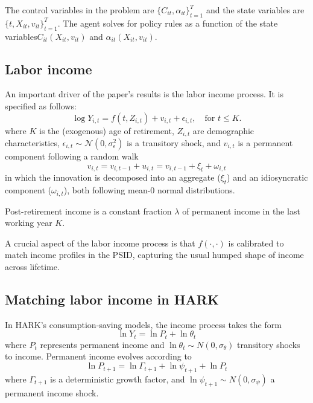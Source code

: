 \documentclass[./CGMPortfolio.tex]{subfiles}
\begin{document}
The control variables in the problem are $\{C_{it}, \alpha_{it}\}^T_{t=1}$ and the state variables are $\{t, X_{it}, v_{it} \}^T_{t=1}$. The agent solves for  policy rules as a function of the state variables\textemdash $C_{it}(X_{it}, v_{it})$ and $\alpha_{it}(X_{it}, v_{it})$.

\subsection{Labor income}

An important driver of the paper's results is the labor income process. It is 
specified as follows:
\begin{equation}
\log Y_{i,t} = f(t,Z_{i,t}) + v_{i,t} + \epsilon_{i,t}, \quad \text{for } t\leq K.
\end{equation}
where $K$ is the (exogenous) age of retirement, $Z_{i,t}$ are demographic 
characteristics, $\epsilon_{i,t}\sim \mathcal{N}(0,\sigma^2_\epsilon)$ is a 
transitory shock, and  $v_{i,t}$ is a permanent component following a random 
walk
\begin{equation}
v_{i,t} = v_{i,t-1} + u_{i,t} = v_{i,t-1} + \xi_t + \omega_{i,t}
\end{equation}
in which the innovation is decomposed into an aggregate ($\xi_t$) and an 
idiosyncratic component ($\omega_{i,t}$), both following mean-0 normal 
distributions.

Post-retirement income is a constant fraction $\lambda$ of permanent income in the last working year $K$.

A crucial aspect of the labor income process is that $f(\cdot,\cdot)$ is calibrated to match income profiles in the PSID, capturing the usual humped shape of income across lifetime.

\subsection{Matching labor income in HARK}

In HARK's consumption-saving models, the income process takes the form
\begin{equation}
\ln Y_t = \ln P_t + \ln \theta_t
\end{equation}
where $P_t$ represents permanent income and $\ln \theta_t \sim N(0,\sigma_\theta)$ transitory shocks to income. Permanent income evolves according to
\begin{equation}
\ln P_{t+1} = \ln \Gamma_{t+1} +  \ln \psi_{t+1} + \ln P_t
\end{equation}
where $\Gamma_{t+1}$ is a deterministic growth factor, and $\ln \psi_{t+1} \sim N(0,\sigma_\psi)$ a permanent income shock. 
\end{document}
